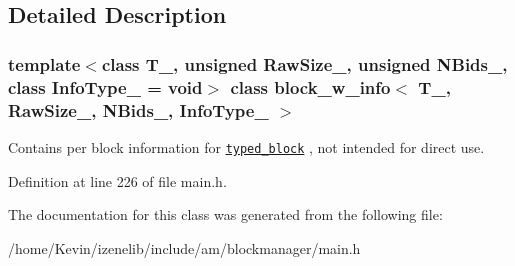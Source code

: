 \subsection{Detailed Description}
\subsubsection*{template$<$class T\_\-, unsigned RawSize\_\-, unsigned NBids\_\-, class InfoType\_\- = void$>$ class block\_\-w\_\-info$<$ T\_\-, RawSize\_\-, NBids\_\-, InfoType\_\- $>$}

Contains per block information for {\tt \hyperlink{classtyped__block}{typed\_\-block}} , not intended for direct use. 

Definition at line 226 of file main.h.

The documentation for this class was generated from the following file:\begin{CompactItemize}
\item 
/home/Kevin/izenelib/include/am/blockmanager/main.h\end{CompactItemize}
